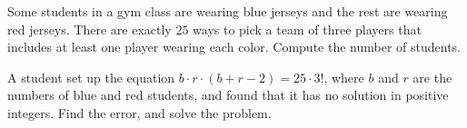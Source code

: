 Some students in a gym class are wearing blue jerseys and the rest are wearing red jerseys. There are exactly $25$ ways to pick a team of three players that includes at least one player wearing each color. Compute the number of students.

A student set up the equation $b\cdot r\cdot(b+r-2)=25\cdot3!$, where $b$ and $r$ are the numbers of blue and red students, and found that it has no solution in positive integers. Find the error, and solve the problem.
